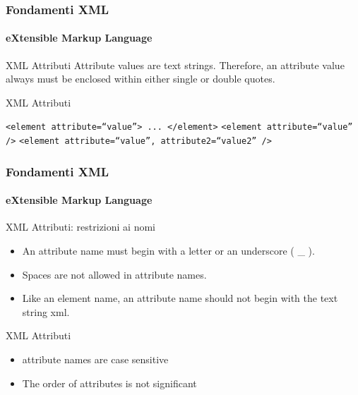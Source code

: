 \begin{frame}
    \frametitle{Fondamenti XML}
    \framesubtitle{eXtensible Markup Language}
    \addtocounter{nframe}{1}

	\begin{block}{XML Attributi}
		Attribute values are text strings. Therefore, an attribute value always must be enclosed within either single or double quotes.
	\end{block}

	\begin{block}{XML Attributi}
		\begin{center}
			\texttt{<element attribute=``value''> ... </element>}
			\texttt{<element attribute=``value'' />}
			\texttt{<element attribute=``value'', attribute2=``value2'' />}
		\end{center}
	\end{block}

\end{frame}

\begin{frame}
    \frametitle{Fondamenti XML}
    \framesubtitle{eXtensible Markup Language}
    \addtocounter{nframe}{1}

	\begin{block}{XML Attributi: restrizioni ai nomi}
		\begin{itemize}
			\item An attribute name must begin with a letter or an underscore ( \_ ).
			\item Spaces are not allowed in attribute names.
			\item Like an element name, an attribute name should not begin with the text string xml.
		\end{itemize}
	\end{block}

	\begin{block}{XML Attributi}
		\begin{itemize}
			\item attribute names are case sensitive
			\item The order of attributes is not significant
		\end{itemize}
	\end{block}

\end{frame}









